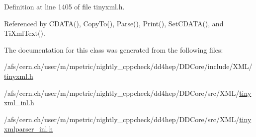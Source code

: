 Definition at line 1405 of file tinyxml.h.

Referenced by CDATA(), CopyTo(), Parse(), Print(), SetCDATA(), and TiXmlText().

The documentation for this class was generated from the following files:\begin{DoxyCompactItemize}
\item 
/afs/cern.ch/user/m/mpetric/nightly\_\-cppcheck/dd4hep/DDCore/include/XML/\hyperlink{tinyxml_8h}{tinyxml.h}\item 
/afs/cern.ch/user/m/mpetric/nightly\_\-cppcheck/dd4hep/DDCore/src/XML/\hyperlink{tinyxml__inl_8h}{tinyxml\_\-inl.h}\item 
/afs/cern.ch/user/m/mpetric/nightly\_\-cppcheck/dd4hep/DDCore/src/XML/\hyperlink{tinyxmlparser__inl_8h}{tinyxmlparser\_\-inl.h}\end{DoxyCompactItemize}

